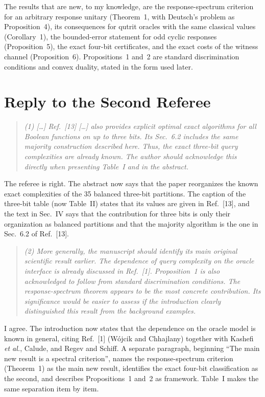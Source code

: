 \documentclass[11pt]{article}
\newenvironment{referee}{\begin{quote}\itshape}{\end{quote}}
\begin{document}
The results that are new, to my knowledge, are the response-spectrum
criterion for an arbitrary response unitary (Theorem~1, with Deutsch's
problem as Proposition~4), its
consequences for qutrit oracles with the same classical values (Corollary~1), the
bounded-error statement for odd cyclic responses (Proposition~5), the exact
four-bit certificates, and the exact costs of the witness channel
(Proposition~6). Propositions~1 and~2 are standard discrimination conditions
and convex duality, stated in the form used later.

\section*{Reply to the Second Referee}

\begin{referee}
(1) [\dots] Ref.~[13] [\dots] also provides explicit optimal exact algorithms
for all Boolean functions on up to three bits. Its Sec.~6.2 includes the same
majority construction described here. Thus, the exact three-bit query
complexities are already known. The author should acknowledge this directly
when presenting Table~I and in the abstract.
\end{referee}

The referee is right. The abstract now says that the paper reorganizes the
known exact complexities of the 35 balanced three-bit partitions. The caption
of the three-bit table (now Table~II) states that its values are given in
Ref.~[13], and the text in Sec.~IV says that the contribution for three bits
is only their organization as balanced partitions and that the majority
algorithm is the one in Sec.~6.2 of Ref.~[13].

\begin{referee}
(2) More generally, the manuscript should identify its main original
scientific result earlier. The dependence of query complexity on the oracle
interface is already discussed in Ref.~[1]. Proposition~1 is also
acknowledged to follow from standard discrimination conditions. The
response-spectrum theorem appears to be the most concrete contribution. Its
significance would be easier to assess if the introduction clearly
distinguished this result from the background examples.
\end{referee}

I agree. The introduction now states that the dependence on the oracle model
is known in general, citing Ref.~[1] (W\'ojcik and Chhajlany) together with
Kashefi \emph{et al.}, Calude, and Regev and Schiff. A separate paragraph,
beginning ``The main new result is a spectral criterion'', names the
response-spectrum criterion (Theorem~1) as the main new result, identifies the
exact four-bit classification as the second, and describes Propositions~1
and~2 as framework. Table~I makes the same separation item by item.
\end{document}
